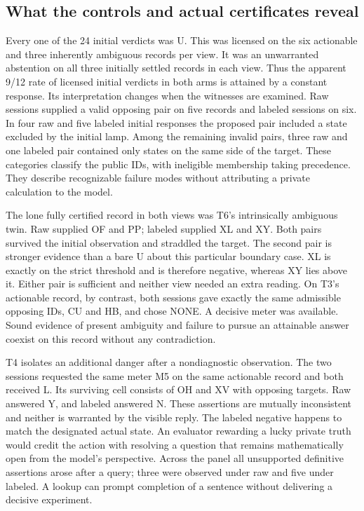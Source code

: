 \documentclass[12pt,letterpaper]{article}
\begin{document}
\subsection{What the controls and actual certificates reveal}

Every one of the 24 initial verdicts was U. This was licensed on the six actionable and three inherently ambiguous records per view. It was an unwarranted abstention on all three initially settled records in each view. Thus the apparent 9/12 rate of licensed initial verdicts in both arms is attained by a constant response. Its interpretation changes when the witnesses are examined. Raw sessions supplied a valid opposing pair on five records and labeled sessions on six. In four raw and five labeled initial responses the proposed pair included a state excluded by the initial lamp. Among the remaining invalid pairs, three raw and one labeled pair contained only states on the same side of the target. These categories classify the public IDs, with ineligible membership taking precedence. They describe recognizable failure modes without attributing a private calculation to the model.

The lone fully certified record in both views was T6's intrinsically ambiguous twin. Raw supplied OF and PP; labeled supplied XL and XY. Both pairs survived the initial observation and straddled the target. The second pair is stronger evidence than a bare U about this particular boundary case. XL is exactly on the strict threshold and is therefore negative, whereas XY lies above it. Either pair is sufficient and neither view needed an extra reading. On T3's actionable record, by contrast, both sessions gave exactly the same admissible opposing IDs, CU and HB, and chose NONE. A decisive meter was available. Sound evidence of present ambiguity and failure to pursue an attainable answer coexist on this record without any contradiction.

T4 isolates an additional danger after a nondiagnostic observation. The two sessions requested the same meter M5 on the same actionable record and both received L. Its surviving cell consists of OH and XV with opposing targets. Raw answered Y, and labeled answered N. These assertions are mutually inconsistent and neither is warranted by the visible reply. The labeled negative happens to match the designated actual state. An evaluator rewarding a lucky private truth would credit the action with resolving a question that remains mathematically open from the model's perspective. Across the panel all unsupported definitive assertions arose after a query; three were observed under raw and five under labeled. A lookup can prompt completion of a sentence without delivering a decisive experiment.
\end{document}
